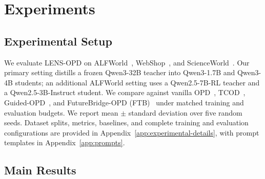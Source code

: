 \documentclass{article}
\begin{document}
\section{Experiments}
\label{sec:experiments}

\subsection{Experimental Setup}

We evaluate LENS-OPD on ALFWorld~\citep{DBLP:conf/iclr/ShridharYCBTH21},
WebShop~\citep{DBLP:conf/nips/Yao0YN22}, and
ScienceWorld~\citep{DBLP:conf/emnlp/WangJCA22}.  Our primary setting distills a frozen
Qwen3-32B teacher into Qwen3-1.7B and Qwen3-4B students; an additional ALFWorld setting
uses a Qwen2.5-7B-RL teacher and a Qwen2.5-3B-Instruct student.  We compare against vanilla
OPD~\citep{agarwal2024policy}, TCOD~\citep{wang2026tcod},
Guided-OPD~\citep{li2026policy}, and FutureBridge-OPD (FTB)~\citep{chen2026look} under matched
training and evaluation budgets.  We report mean $\pm$ standard deviation over five random
seeds.  Dataset splits, metrics, baselines, and complete training and evaluation configurations
are provided in Appendix~\ref{app:experimental-details}, with prompt templates in
Appendix~\ref{app:prompts}.

\subsection{Main Results}
\end{document}

